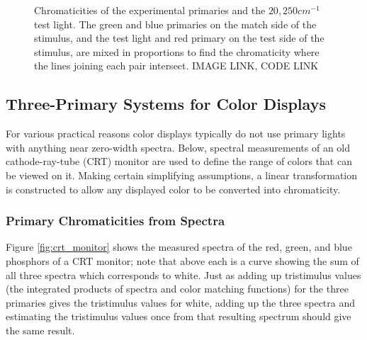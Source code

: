 \documentclass[twocolumn]{article}
\newif\ifinvert
\begin{document}
\begin{figure}[h]
    \ifinvert
        
    \else
        
    \fi
    \caption{Chromaticities of the experimental primaries and the $20,250cm^{-1}$ test light.  The green and blue primaries on the match side of the stimulus, and the test light and red primary on the test side of the stimulus, are mixed in proportions to find the chromaticity where the lines joining each pair intersect.  IMAGE LINK, CODE LINK}\label{fig:color_matching_experiment_mixing}
\end{figure}
\subsection{Three-Primary Systems for Color Displays}
For various practical reasons color displays typically do not use primary lights with anything near zero-width spectra.  Below, spectral measurements of an old cathode-ray-tube (CRT) monitor are used to define the range of colors that can be viewed on it.  Making certain simplifying assumptions, a linear transformation is constructed to allow any displayed color to be converted into chromaticity.
\subsubsection{Primary Chromaticities from Spectra}
Figure \ref{fig:crt_monitor} shows the measured spectra of the red, green, and blue phosphors of a CRT monitor; note that above each is a curve showing the sum of all three spectra which corresponds to white.  Just as adding up tristimulus values (the integrated products of spectra and color matching functions) for the three primaries gives the tristimulus values for white, adding up the three spectra and estimating the tristimulus values once from that resulting spectrum should give the same result.\\
\begin{figure*}[h]
    \ifinvert
        
    \else
        
    \fi
    \caption{Red, green, and blue phosphor spectra measured from a CRT monitor.  Above each spectral line is also shown the summed spectrum of white (dashed line).  The right panel plots the chromaticities (within the CIE 170-2 10$^\circ$ standard) of the three phosphors and white; the triangle formed by the three primaries is the monitor's color gamut.  All colors that can be shown by combining the three phosphors at various intensities fall within the color gamut triangle.  IMAGE LINK, CODE LINK}\label{fig:crt_monitor}
\end{figure*}
\end{document}
